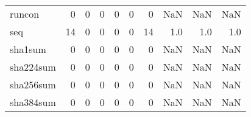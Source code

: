 \begin{longtable}{lrrrrrrrrr}
runcon    &                                                  0 &                                                  0 &                                                  0 &                                                  0 &                                                  0 &                                                  0 &                                                NaN &                                    NaN &                                  NaN \\
seq       &                                                 14 &                                                  0 &                                                  0 &                                                  0 &                                                  0 &                                                 14 &                                                1.0 &                                    1.0 &                                  1.0 \\
sha1sum   &                                                  0 &                                                  0 &                                                  0 &                                                  0 &                                                  0 &                                                  0 &                                                NaN &                                    NaN &                                  NaN \\
sha224sum &                                                  0 &                                                  0 &                                                  0 &                                                  0 &                                                  0 &                                                  0 &                                                NaN &                                    NaN &                                  NaN \\
sha256sum &                                                  0 &                                                  0 &                                                  0 &                                                  0 &                                                  0 &                                                  0 &                                                NaN &                                    NaN &                                  NaN \\
sha384sum &                                                  0 &                                                  0 &                                                  0 &                                                  0 &                                                  0 &                                                  0 &                                                NaN &                                    NaN &                                  NaN \\

\end{longtable}
